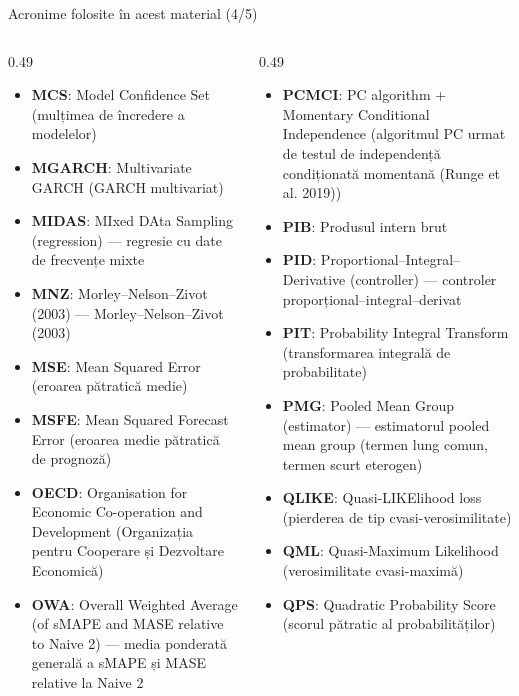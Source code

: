 \begin{frame}{Acronime folosite în acest material (4/5)}
\begin{columns}[T]
\begin{column}{0.49\textwidth}
\begin{itemize}\setlength{\itemsep}{0pt}
    \item \textbf{MCS}: Model Confidence Set (mulțimea de încredere a modelelor)
    \item \textbf{MGARCH}: Multivariate GARCH (GARCH multivariat)
    \item \textbf{MIDAS}: MIxed DAta Sampling (regression) — regresie cu date de frecvențe mixte
    \item \textbf{MNZ}: Morley–Nelson–Zivot (2003) — Morley–Nelson–Zivot (2003)
    \item \textbf{MSE}: Mean Squared Error (eroarea pătratică medie)
    \item \textbf{MSFE}: Mean Squared Forecast Error (eroarea medie pătratică de prognoză)
    \item \textbf{OECD}: Organisation for Economic Co-operation and Development (Organizația pentru Cooperare și Dezvoltare Economică)
    \item \textbf{OWA}: Overall Weighted Average (of sMAPE and MASE relative to Naive 2) — media ponderată generală a sMAPE și MASE relative la Naive 2
\end{itemize}
\end{column}
\begin{column}{0.49\textwidth}
\begin{itemize}\setlength{\itemsep}{0pt}
    \item \textbf{PCMCI}: PC algorithm + Momentary Conditional Independence (algoritmul PC urmat de testul de independență condiționată momentană (Runge et al. 2019))
    \item \textbf{PIB}: Produsul intern brut
    \item \textbf{PID}: Proportional--Integral--Derivative (controller) — controler proporțional--integral--derivat
    \item \textbf{PIT}: Probability Integral Transform (transformarea integrală de probabilitate)
    \item \textbf{PMG}: Pooled Mean Group (estimator) — estimatorul pooled mean group (termen lung comun, termen scurt eterogen)
    \item \textbf{QLIKE}: Quasi-LIKElihood loss (pierderea de tip cvasi-verosimilitate)
    \item \textbf{QML}: Quasi-Maximum Likelihood (verosimilitate cvasi-maximă)
    \item \textbf{QPS}: Quadratic Probability Score (scorul pătratic al probabilităților)
\end{itemize}
\end{column}
\end{columns}
\end{frame}
